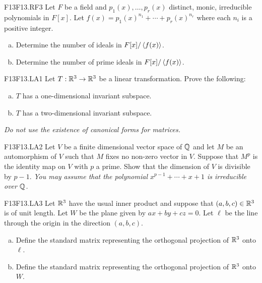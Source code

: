 \documentclass[../AlgebraQualSolutions.tex]{subfiles}
\begin{document}
\begin{prob}{F13}{F13.RF3}
	Let $F$ be a field and $p_1(x), \ldots, p_r(x)$ distinct, monic, irreducible polynomials in $F[x]$. Let $f(x) = p_1(x)^{n_1} + \cdots + p_r(x)^{n_r}$ where each $n_i$ is a positive integer.

	\begin{enumerate}[(a)]
		\item Determine the number of ideals in $F[x]/\left\langle f(x) \right\rangle$.
		\item Determine the number of prime ideals in $F[x]/\left\langle f(x) \right\rangle$.
	\end{enumerate}
\end{prob}

\begin{prob}{F13}{F13.LA1}
	Let $T: \mathbb{R}^3 \to \mathbb{R}^3$ be a linear transformation. Prove the following:
	\begin{enumerate}[(a)]
		\item $T$ has a one-dimensional invariant subspace.
		\item $T$ has a two-dimensional invariant subspace.
	\end{enumerate}

	\emph{ Do not use the existence of canonical forms for matrices.}
\end{prob}

\begin{prob}{F13}{F13.LA2}
	Let $V$ be a finite dimensional vector space of $\mathbb{Q}$ and let $M$ be an automorphism of $V$ such that $M$ fixes no non-zero vector in $V$. Suppose that $M^p$ is the identity map on $V$ with $p$ a prime. Show that the dimension of $V$ is divisible by $p-1$. \emph{ You may assume that the polynomial $x^{p-1} + \cdots + x + 1$ is irreducible  over $\mathbb{Q}$.}
\end{prob}

\begin{prob}{F13}{F13.LA3}
	Let $\mathbb{R}^3$ have  the usual inner product and suppose that $(a,b,c) \in \mathbb{R}^3$ is of unit length. Let $W$ be the plane given by $ax + by + cz = 0$. Let $\ell$ be the line through the origin in the direction $(a,b,c)$.
	\begin{enumerate}[(a)]
		\item Define the standard matrix representing the orthogonal projection of $\mathbb{R}^3$ onto $\ell$.
		\item Define the standard matrix representing the orthogonal projection of $\mathbb{R}^3$ onto $W$.
	\end{enumerate}
\end{prob}
\end{document}
